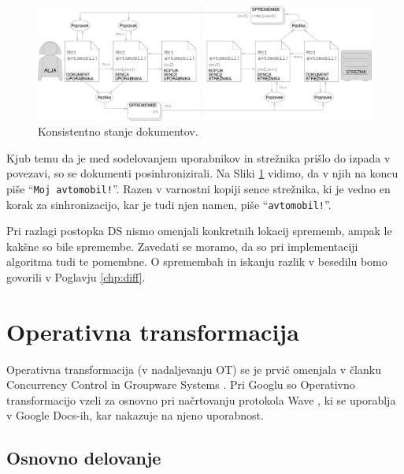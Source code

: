 \documentclass[a4paper, 12pt, twoside]{book}
\begin{document}
\begin{figure}[placement h]
\begin{center}
\includegraphics[width=16cm]{img/ds10.pdf}
\end{center}
\caption{Konsistentno stanje dokumentov.}
\label{ds10}
\end{figure}

Kjub temu da je med sodelovanjem uporabnikov in strežnika prišlo do izpada v povezavi, so se dokumenti posinhronizirali. Na Sliki \ref{ds10} vidimo, da v njih na koncu piše “{\tt Moj avtomobil!}”. Razen v varnostni kopiji sence strežnika, ki je vedno en korak za sinhronizacijo, kar je tudi njen namen, piše “{\tt avtomobil!}”.

Pri razlagi postopka DS nismo omenjali konkretnih lokacij sprememb, ampak le kakšne so bile spremembe. Zavedati se moramo, da so pri implementaciji algoritma tudi te pomembne. O spremembah in iskanju razlik v besedilu bomo govorili v \linebreak Poglavju \ref{chp:diff}.

\newpage

\section{Operativna transformacija}
\label{sec:ot}

Operativna transformacija (v nadaljevanju OT) se je prvič omenjala v članku Concurrency Control in Groupware Systems \cite{ccigs}. Pri Googlu so Operativno transformacijo vzeli za osnovno pri načrtovanju protokola Wave \cite{wave-ot}, ki se uporablja v Google Docs-ih, kar nakazuje na njeno uporabnost.

\subsection{Osnovno delovanje}
\end{document}
